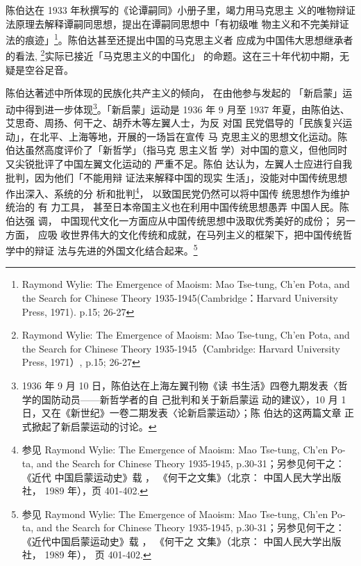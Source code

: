 陈伯达在 1933 年秋撰写的《论谭嗣同》小册子里，竭力用马克思主
义的唯物辩证法原理去解释谭嗣同思想，提出在谭嗣同思想中「有初级唯
物主义和不完美辩证法的痕迹」\footnote{Raymond Wylie: The Emergence of Maoism: Mao Tse-tung, Ch’en Pota, and the Search for Chinese Theory
1935-1945(Cambridge：Harvard University Press, 1971). p.15; 26-27
}。陈伯达甚至还提出中国的马克思主义者
应成为中国伟大思想继承者的看法, \footnote{Raymond Wylie: The Emergence of Maoism: Mao Tse-tung, Ch’en Pota, and the Search for Chinese Theory
1935-1945（Cambridge: Harvard University Press, 1971）, p.15; 26-27}实际已接近「马克思主义的中国化」
的命题。这在三十年代初中期，无疑是空谷足音。

陈伯达著述中所体现的民族化共产主义的倾向， 在由他参与发起的 「新启蒙」运
动中得到进一步体现\footnote{1936 年 9 月 10 日，陈伯达在上海左翼刊物《读
书生活》四卷九期发表〈哲学的国防动员——新哲学者的自 己批判和关于新启蒙运
动的建议〉，10 月 1 日，又在《新世纪》一卷二期发表〈论新启蒙运动〉；陈
伯达的这两篇文章 正式掀起了新启蒙运动的讨论。}。「新启蒙」运动是 1936 年
9 月至 1937 年夏，由陈伯达、艾思奇、周扬、何干之、胡乔木等左翼人士，为反
对国 民党倡导的「民族复兴运动」，在北平、上海等地，开展的一场旨在宣传 马
克思主义的思想文化运动。陈伯达虽然高度评价了「新哲学」（指马克 思主义哲
学）对中国的意义，但他同时又尖锐批评了中国左翼文化运动的 严重不足。陈伯
达认为，左翼人士应进行自我批判，因为他们「不能用辩 证法来解释中国的现实
生活」，没能对中国传统思想作出深入、系统的分 析和批判\footnote{参见
Raymond Wylie: The Emergence of Maoism: Mao Tse-tung, Ch’en Po-ta, and
the Search for Chinese Theory 1935-1945, p.30-31；另参见何干之： 《近代
中国启蒙运动史》载 ， 《何干之文集》（北京： 中国人民大学出版社， 1989
年），页 401-402.}， 以致国民党仍然可以将中国传 统思想作为维护统治的 有
力工具， 甚至日本帝国主义也在利用中国传统思想愚弄 中国人民。陈伯达强 调，
中国现代文化一方面应从中国传统思想中汲取优秀美好的成份； 另一方面， 应吸
收世界伟大的文化传统和成就，在马列主义的框架下，把中国传统哲 学中的辩证
法与先进的外国文化结合起来。\footnote{参见 Raymond Wylie: The Emergence
of Maoism: Mao Tse-tung, Ch’en Po-ta, and the Search for Chinese Theory
1935-1945, p.30-31；另参见何干之： 《近代中国启蒙运动史》载 ， 《何干之
文集》（北京： 中国人民大学出版社， 1989 年）， 页 401-402.  } 

